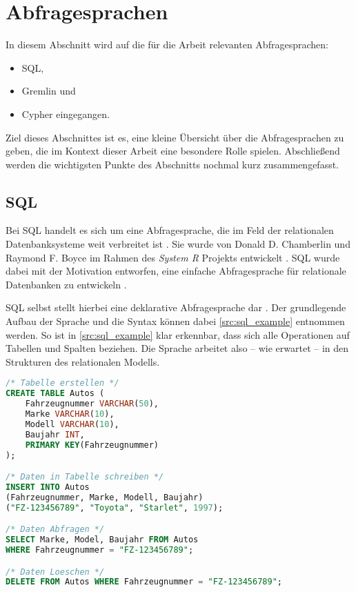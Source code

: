 \section{Abfragesprachen}
In diesem Abschnitt wird auf die für die Arbeit relevanten Abfragesprachen:
\begin{itemize}
    \item SQL,
    \item Gremlin und
    \item Cypher eingegangen.
\end{itemize}
Ziel dieses Abschnittes ist es, eine kleine Übersicht über die Abfragesprachen zu geben, die im Kontext dieser Arbeit eine besondere Rolle spielen. Abschließend werden die wichtigsten Punkte des Abschnitts nochmal kurz zusammengefasst.

\subsection{SQL}
Bei SQL handelt es sich um eine Abfragesprache, die im Feld der relationalen Datenbanksysteme weit verbreitet ist \cite{sql_history}. Sie wurde von Donald D. Chamberlin und Raymond F. Boyce im Rahmen des \textit{System R} Projekts entwickelt \cite{sql_history}. SQL wurde dabei mit der Motivation entworfen, eine einfache Abfragesprache für relationale Datenbanken zu entwickeln \cite{sql_history}. 

SQL selbst stellt hierbei eine deklarative Abfragesprache dar \cite{sql_history}. Der grundlegende Aufbau der Sprache und die Syntax können dabei \autoref{src:sql_example} entnommen werden. So ist in \autoref{src:sql_example} klar erkennbar, dass sich alle Operationen auf Tabellen und Spalten beziehen. Die Sprache arbeitet also -- wie erwartet -- in den Strukturen des relationalen Modells.

\begin{lstlisting}[caption={Beispiel SQL-Queries},language=SQL,label=src:sql_example]
/* Tabelle erstellen */
CREATE TABLE Autos (
    Fahrzeugnummer VARCHAR(50), 
    Marke VARCHAR(10), 
    Modell VARCHAR(10), 
    Baujahr INT,
    PRIMARY KEY(Fahrzeugnummer)
);

/* Daten in Tabelle schreiben */
INSERT INTO Autos 
(Fahrzeugnummer, Marke, Modell, Baujahr) 
("FZ-123456789", "Toyota", "Starlet", 1997);

/* Daten Abfragen */
SELECT Marke, Model, Baujahr FROM Autos 
WHERE Fahrzeugnummer = "FZ-123456789";

/* Daten Loeschen */
DELETE FROM Autos WHERE Fahrzeugnummer = "FZ-123456789";
\end{lstlisting}

